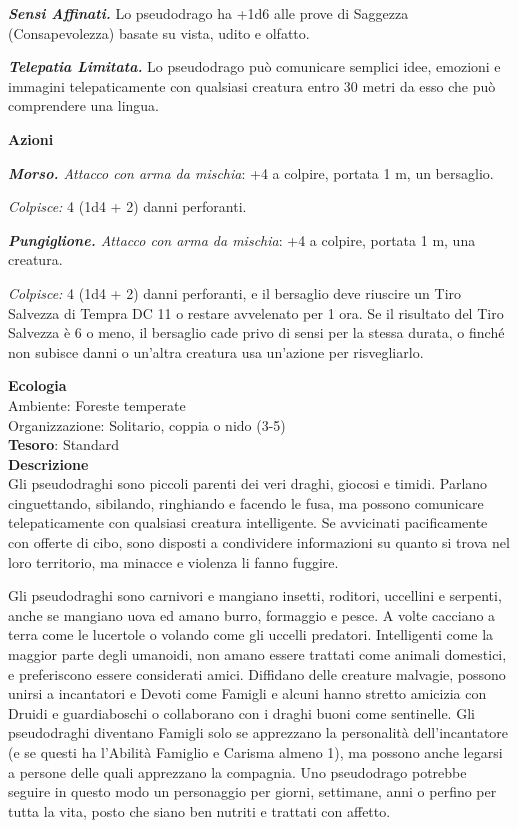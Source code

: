 \begin{multicols}{2}
	\textit{\textbf{Sensi Affinati.}} Lo pseudodrago ha +1d6 alle prove di Saggezza (Consapevolezza) basate su vista, udito e olfatto.

	\textit{\textbf{Telepatia Limitata.}} Lo pseudodrago può comunicare semplici idee, emozioni e immagini telepaticamente con qualsiasi creatura entro 30 metri da esso che può comprendere una lingua.

	\textbf{Azioni}

	\textit{\textbf{Morso.} Attacco con arma da mischia}: +4 a colpire, portata 1 m, un bersaglio.

	\textit{Colpisce:} 4 (1d4 + 2) danni perforanti.

	\textit{\textbf{Pungiglione.} Attacco con arma da mischia}: +4 a colpire, portata 1 m, una creatura.

	\textit{Colpisce:} 4 (1d4 + 2) danni perforanti, e il bersaglio deve riuscire un Tiro Salvezza di Tempra DC 11 o restare avvelenato per 1 ora. Se il risultato del Tiro Salvezza è 6 o meno, il bersaglio cade privo di sensi per la stessa durata, o finché non subisce danni o un'altra creatura usa un'azione per risvegliarlo.

	\textbf{Ecologia}\\
	Ambiente: Foreste temperate\\
	Organizzazione: Solitario, coppia o nido (3-5)\\
	\textbf{Tesoro}: Standard\\
	\textbf{Descrizione}\\
	Gli pseudodraghi sono piccoli parenti dei veri draghi, giocosi e timidi. Parlano cinguettando, sibilando, ringhiando e facendo le fusa, ma possono comunicare telepaticamente con qualsiasi creatura intelligente. Se avvicinati pacificamente con offerte di cibo, sono disposti a condividere informazioni su quanto si trova nel loro territorio, ma minacce e violenza li fanno fuggire.

	Gli pseudodraghi sono carnivori e mangiano insetti, roditori, uccellini e serpenti, anche se mangiano uova ed amano burro, formaggio e pesce. A volte cacciano a terra come le lucertole o volando come gli uccelli predatori. Intelligenti come la maggior parte degli umanoidi, non amano essere trattati come animali domestici, e preferiscono essere considerati amici. Diffidano delle creature malvagie, possono unirsi a incantatori e Devoti come Famigli e alcuni hanno stretto amicizia con Druidi e guardiaboschi o collaborano con i draghi buoni come sentinelle. Gli pseudodraghi diventano Famigli solo se apprezzano la personalità dell'incantatore (e se questi ha l'Abilità Famiglio e Carisma almeno 1), ma possono anche legarsi a persone delle quali apprezzano la compagnia. Uno pseudodrago potrebbe seguire in questo modo un personaggio per giorni, settimane, anni o perfino per tutta la vita, posto che siano ben nutriti e trattati con affetto.


\end{multicols}
